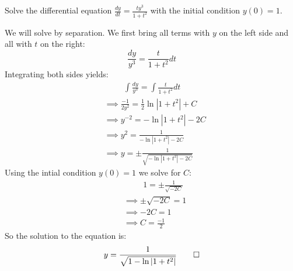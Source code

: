 \begin{example}
    Solve the differential equation $\frac{dy}{dt} = \frac{ty^3}{1 + t^2}$ with the initial condition $y(0) = 1$.
\end{example}
\begin{solution}
    We will solve by separation. We first bring all terms with $y$ on the left side and all with $t$ on the right:
    \[\frac{dy}{y^3} = \frac{t}{1 + t^2}dt\]
    Integrating both sides yields:
    \begin{align*}
        &\hspace{1cm} \int \frac{dy}{y^3} = \int \frac{t}{1 + t^2}dt \\
        & \implies \frac{-1}{2y^2} = \frac{1}{2}\ln|1 + t^2| + C \\
        &\implies y^{-2} = -\ln|1 + t^2| - 2C \\
        &\implies y^2 = \frac{1}{-\ln|1 + t^2| - 2C} \\
        &\implies y = \pm\frac{1}{\sqrt{-\ln|1 + t^2| - 2C}}
    \end{align*}
    Using the intial condition $y(0) = 1$ we solve for $C$:
    \begin{align*}
        &\hspace{1cm} 1 = \pm \frac{1}{\sqrt{-2C}} \\
        &\implies \pm\sqrt{-2C} = 1 \\
        &\implies -2C = 1 \\
        &\implies C = \frac{-1}{2}
    \end{align*}
    So the solution to the equation is:
    \[y = \frac{1}{\sqrt{1 - \ln|1 + t^2|}} \qedhere\] 
\end{solution}

